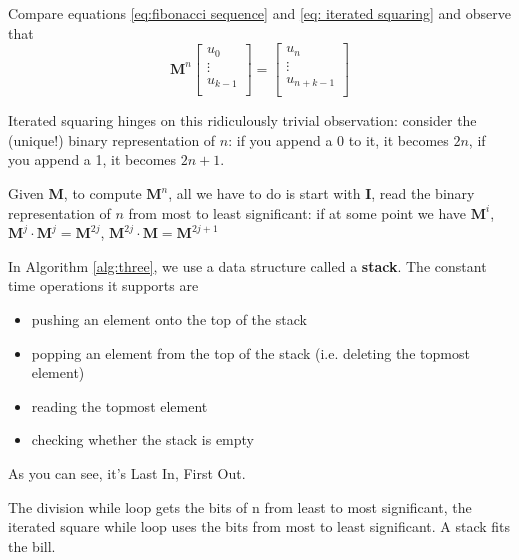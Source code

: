 \documentclass{article}
\theoremstyle{definition}
\begin{document}
Compare equations \ref{eq:fibonacci sequence} and \ref{eq: iterated squaring} and observe that
\begin{equation}
    \textbf{M}^n
    \begin{bmatrix}
        u_0 \\
        \vdots \\
        u_{k-1} \\
    \end{bmatrix}
    =
    \begin{bmatrix}
        u_n \\
        \vdots \\
        u_{n+k-1} \\
    \end{bmatrix}
\end{equation}

Iterated squaring hinges on this ridiculously trivial observation: consider the (unique!) binary representation of $n$: if you append a 0 to it, it becomes $2n$, if you append a 1, it becomes $2n + 1$.

Given \textbf{M}, to compute $\textbf{M}^n$, all we have to do is start with \textbf{I}, read the binary representation of $n$ from most to least significant: if at some point we have $\textbf{M}^i$, $\textbf{M}^j \cdot \textbf{M}^j = \textbf{M}^{2j}$, $\textbf{M}^{2j} \cdot \textbf{M} = \textbf{M}^{2j+1}$

In Algorithm \ref{alg:three}, we use a data structure called a \textbf{stack}. The constant time operations it supports are
\begin{itemize}
  \item pushing an element onto the top of the stack
  \item popping an element from the top of the stack (i.e. deleting the topmost element)
  \item reading the topmost element
  \item checking whether the stack is empty
\end{itemize}
 
As you can see, it's Last In, First Out.

The division while loop gets the bits of n from least to most significant, the iterated square while loop uses the bits from most to least significant. A stack fits the bill.
\end{document}
